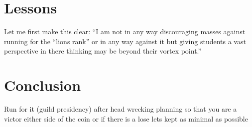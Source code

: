 \documentclass{article}
\begin{document}
\section {Lessons} {Let me first make this clear: “I am not in any way discouraging masses against running for the “lions rank” or in any way against it but giving students a vast perspective in there thinking may be beyond their vortex point.” 
}
\section {Conclusion}  {Run for it (guild presidency) after head wrecking planning so that you are a victor either side of the coin or if there is a lose lets kept as minimal as possible
}   
\end{document}
